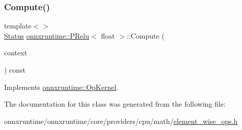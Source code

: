 \subsubsection{\texorpdfstring{Compute()}{Compute()}\hspace{0.1cm}{\footnotesize\ttfamily [2/2]}}
{\footnotesize\ttfamily template$<$$>$ \\
\mbox{\hyperlink{classonnxruntime_1_1common_1_1Status}{Status}} \mbox{\hyperlink{classonnxruntime_1_1PRelu}{onnxruntime\+::\+P\+Relu}}$<$ float $>$\+::Compute (\begin{DoxyParamCaption}\item[{\mbox{\hyperlink{classonnxruntime_1_1OpKernelContext}{Op\+Kernel\+Context}} $\ast$}]{context }\end{DoxyParamCaption}) const\hspace{0.3cm}{\ttfamily [virtual]}}



Implements \mbox{\hyperlink{classonnxruntime_1_1OpKernel_a9eca8656a78b1b3ab9d3351a12798650}{onnxruntime\+::\+Op\+Kernel}}.



The documentation for this class was generated from the following file\+:\begin{DoxyCompactItemize}
\item 
onnxruntime/onnxruntime/core/providers/cpu/math/\mbox{\hyperlink{element__wise__ops_8h}{element\+\_\+wise\+\_\+ops.\+h}}\end{DoxyCompactItemize}

